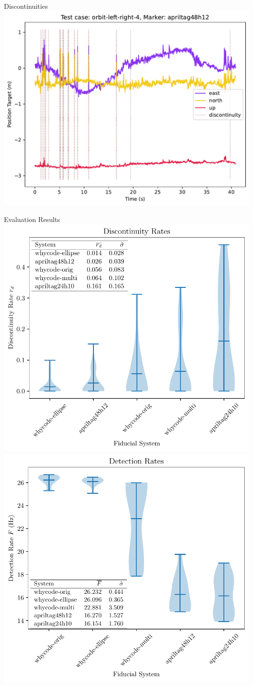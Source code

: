 \documentclass[aspectratio=169]{beamer}
\begin{document}
\begin{frame}{Discontinuities}
	\centering
	\includegraphics[width=0.75\linewidth]{images/orbit-left-right-4_apriltag48h12_position-target}
\end{frame}

\begin{frame}{Evaluation Results}
    \centering
    \includegraphics[width=0.49\linewidth]{./images/violin_plot_five_member}
    \includegraphics[width=0.49\linewidth]{./images/violin_plot_speed_five_member}
\end{frame}
\end{document}
